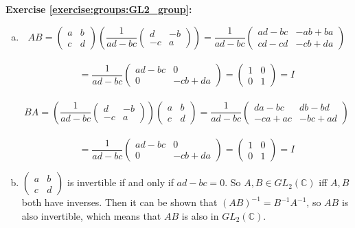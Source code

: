 \noindent\textbf{Exercise \ref{exercise:groups:GL2_group}:}
\begin{enumerate}[(a)]
\item
\[
AB =
\begin{pmatrix}
a & b \\
c & d
\end{pmatrix} \left(\frac{1}{ad-bc}\begin{pmatrix}
d & -b \\
-c & a
\end{pmatrix}\right)
=
\frac{1}{ad-bc}\begin{pmatrix}
ad - bc & -ab + ba \\
cd - cd & -cb + da
\end{pmatrix}
\]
\\
\[
=
\frac{1}{ad-bc}\begin{pmatrix}
ad - bc & 0 \\
0 & -cb + da
\end{pmatrix}
=
\begin{pmatrix}
1 & 0 \\
0 & 1
\end{pmatrix}
=
I
\]
\\
\[
BA =
\left(\frac{1}{ad-bc}\begin{pmatrix}
d & -b \\
-c & a
\end{pmatrix}\right)\begin{pmatrix}
a & b \\
c & d
\end{pmatrix} 
=
\frac{1}{ad-bc}\begin{pmatrix}
da - bc & db - bd \\
-ca + ac & -bc + ad
\end{pmatrix}
\]
\\
\[
=
\frac{1}{ad-bc}\begin{pmatrix}
ad - bc & 0 \\
0 & -cb + da
\end{pmatrix}
=
\begin{pmatrix}
1 & 0 \\
0 & 1
\end{pmatrix}
=
I
\]

\item
$
\begin{pmatrix}
a & b \\
c & d
\end{pmatrix}$
 is invertible if and only if $ad-bc=0$.  So $A,B \in  GL_2(\mathbb{C})$ iff $A,B$ both have inverses. Then it can be shown that $(AB)^{-1} = B^{-1}A^{-1}$, so $AB$ is also invertible, which means that $AB$ is also in $GL_2(\mathbb{C})$.


\end{enumerate}
